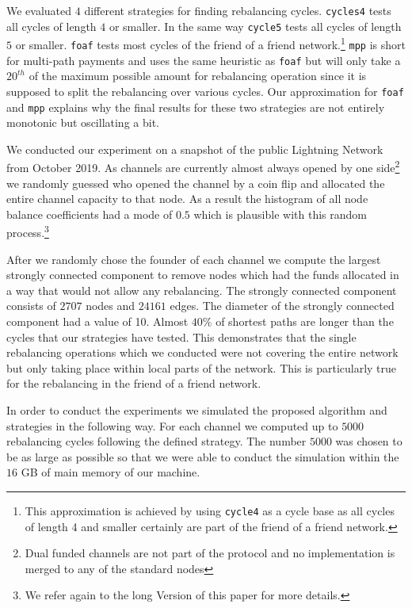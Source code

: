 \documentclass[conference]{IEEEtran}
\begin{document}
We evaluated $4$ different strategies for finding rebalancing cycles. \texttt{cycles4} tests all cycles of length $4$ or smaller. In the same way \texttt{cycle5} tests all cycles of length $5$ or smaller. \texttt{foaf} tests most cycles of the friend of a friend network.\footnote{This approximation is achieved by using \texttt{cycle4} as a cycle base as all cycles of length 4 and smaller certainly are part of the friend of a friend network.}
\texttt{mpp} is short for multi-path payments and uses the same heuristic as \texttt{foaf} but will only take a $20^{th}$ of the maximum possible amount for rebalancing operation since it is supposed to split the rebalancing over various cycles.
Our approximation for \texttt{foaf} and \texttt{mpp} explains why the final results for these two strategies are not entirely monotonic but oscillating a bit.

We conducted our experiment on a snapshot of the public Lightning Network from October 2019.
As channels are currently almost always opened by one side\footnote{Dual funded channels are not part of the protocol and no implementation is merged to any of the standard nodes} we randomly guessed who opened the channel by a coin flip and allocated the entire channel capacity to that node.
As a result the histogram of all node balance coefficients had a mode of $0.5$ which is plausible with this random process.\footnote{We refer again to the long Version of this paper for more details.}

After we randomly chose the founder of each channel we compute the largest strongly connected component to remove nodes which had the funds allocated in a way that would not allow any rebalancing.
The strongly connected component consists of $2707$ nodes and $24161$ edges.
The diameter of the strongly connected component had a value of 10.
Almost $40\%$ of shortest paths are longer than the cycles that our strategies have tested. 
This demonstrates that the single rebalancing operations which we conducted were not covering the entire network but only taking place within local parts of the network.
This is particularly true for the rebalancing in the friend of a friend network.

In order to conduct the experiments we simulated the proposed algorithm and strategies in the following way.
For each channel we computed up to $5000$ rebalancing cycles following the defined strategy.
The number $5000$ was chosen to be as large as possible so that we were able to conduct the simulation within the $16$ GB of main memory of our machine.
\end{document}
